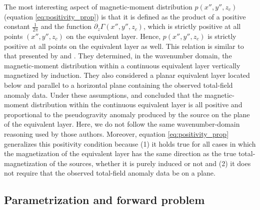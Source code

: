 The most interesting aspect of magnetic-moment distribution $p(x'', y'', z_{c})$
(equation \ref{eq:positivity_prop}) is that it is defined as the product of a
positive constant $\frac{1}{2\pi}$ and the 
function $\partial_{z} \Gamma(x'',y'',z_{c})$, which is strictly  
positive at all points $(x'',y'',z_{c})$ on the equivalent layer. 
Hence, $p(x'', y'', z_{c})$ is strictly positive at all points on the
equivalent layer as well.
This relation is similar to that presented by \cite{pedersen1991} and 
\cite{li_etal_2014}. They determined, in the wavenumber domain, the 
magnetic-moment distribution within a continuous equivalent layer 
vertically magnetized by induction. 
They also considered a planar equivalent layer located below and parallel to a 
horizontal plane containing the observed total-field anomaly data. 
Under these assumptions, \cite{pedersen1991} and \cite{li_etal_2014} 
concluded that the magnetic-moment distribution within the continuous equivalent layer 
is all positive and proportional to the pseudogravity anomaly produced by the source 
on the plane of the equivalent layer.
Here, we do not follow the same wavenumber-domain 
reasoning used by those authors. Moreover, equation \ref{eq:positivity_prop} 
generalizes this positivity condition because (1) it holds true for all cases in which 
the magnetization of the equivalent layer has the same direction as the true 
total-magnetization of the sources, whether it is purely induced or not and 
(2) it does not require that the observed total-field anomaly data be on a plane. 


\subsection{Parametrization and forward problem}

